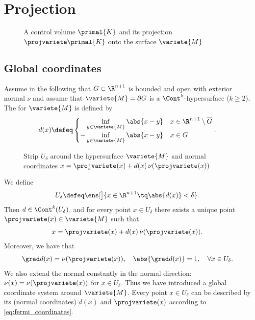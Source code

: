 
\section{Projection}

\begin{figure}[H]
    \centering
    
    \caption{A control volume $\primal{K}$ and its projection $\projvariete \primal{K}$ onto the surface $\variete{M}$}
\end{figure}

\subsection{Global coordinates}

\cite[Sec. 2.3]{dziuk_finite_2013} Assume in the following that $G \subset \R^{n+1}$ is bounded and open with exterior normal $\nu$ and assume that $\variete{M} = \partial G$ is a $\Cont^k$-hypersurface ($k \geqslant 2$). The  for $\variete{M}$ is defined by
\[
d(x) \defeq \begin{cases}
\phantom{-} \inf\limits_{y \in \variete{M}} \abs{x - y} & x \in \R^{n+1} \setminus \overline{G} \\
- \inf\limits_{y \in \variete{M}} \abs{x - y} & x \in G
\end{cases}.
\]

\begin{figure}[H]
    \centering
    
    \caption{Strip $U_\delta$ around the hypersurface $\variete{M}$ and normal coordinates $x = \projvariete(x) + d(x) \, \nu(\projvariete(x))$}
\end{figure}

\begin{lemme} \label{lemme:fermi_coordinates}
We define
\[
U_\delta \defeq \ens[\big]{x \in \R^{n+1} \tq \abs{d(x)} < \delta}.
\]
Then $d \in \Cont^k(U_\delta)$, and for every point $x \in U_\delta$ there exists a unique point $\projvariete(x) \in \variete{M}$ such that
\begin{equation} \label{eq:fermi_coordinates}
x = \projvariete(x) + d(x) \, \nu(\projvariete(x)).
\end{equation}
Moreover, we have that
\[
\grad d(x) = \nu(\projvariete(x)), \quad \abs{\grad d(x)} = 1, \quad \forall x \in U_\delta. 
\]
We also extend the normal constantly in the normal direction: $\nu(x) = \nu(\projvariete(x))$ for $x \in U_\delta$. Thus we have introduced a global coordinate system around $\variete{M}$. Every point $x \in U_\delta$ can be described by its  (normal coordinates) $d(x)$ and $\projvariete(x)$ according to \ref{eq:fermi_coordinates}.
\end{lemme}


